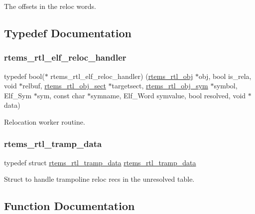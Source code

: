 The offsets in the reloc words. 

\subsection{Typedef Documentation}
\mbox{\label{rtl-elf_8c_a49100f2820d4b5ab9d71e7a5cc856bd9}} 
\subsubsection{\texorpdfstring{rtems\_rtl\_elf\_reloc\_handler}{rtems\_rtl\_elf\_reloc\_handler}}
{\footnotesize\ttfamily typedef bool($\ast$ rtems\+\_\+rtl\+\_\+elf\+\_\+reloc\+\_\+handler) (\mbox{\hyperlink{structrtems__rtl__obj}{rtems\+\_\+rtl\+\_\+obj}} $\ast$obj, bool is\+\_\+rela, void $\ast$relbuf, \mbox{\hyperlink{structrtems__rtl__obj__sect}{rtems\+\_\+rtl\+\_\+obj\+\_\+sect}} $\ast$targetsect, \mbox{\hyperlink{structrtems__rtl__obj__sym}{rtems\+\_\+rtl\+\_\+obj\+\_\+sym}} $\ast$symbol, Elf\+\_\+\+Sym $\ast$sym, const char $\ast$symname, Elf\+\_\+\+Word symvalue, bool resolved, void $\ast$data)}

Relocation worker routine. \mbox{\label{rtl-elf_8c_a28bb76c7d71d2cd980d0da6c20795fc7}} 
\subsubsection{\texorpdfstring{rtems\_rtl\_tramp\_data}{rtems\_rtl\_tramp\_data}}
{\footnotesize\ttfamily typedef struct \mbox{\hyperlink{structrtems__rtl__tramp__data}{rtems\+\_\+rtl\+\_\+tramp\+\_\+data}}  \mbox{\hyperlink{structrtems__rtl__tramp__data}{rtems\+\_\+rtl\+\_\+tramp\+\_\+data}}}

Struct to handle trampoline reloc recs in the unresolved table. 

\subsection{Function Documentation}
\mbox{\label{rtl-elf_8c_a83c2600373c123a070d3762fbb90d367}} 
